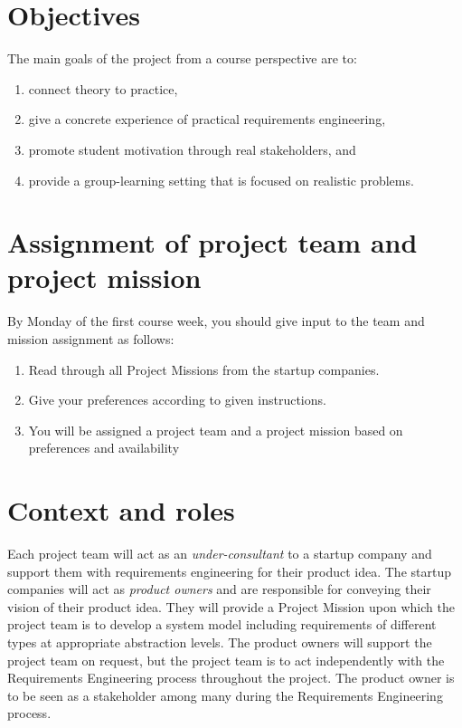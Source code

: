 \maketitle
\vspace{-1cm}

\section{Objectives}
The main goals of the project from a course perspective are to:
\begin{enumerate}[noitemsep]
\item connect theory to practice,
\item give a concrete experience of practical requirements engineering,
\item promote student motivation through real stakeholders, and
\item provide a group-learning setting that is focused on realistic problems.
\end{enumerate}

\ifteknolog
   \section{Assignment of project team and project mission}
   By Monday of the first course week, you should give input to the team and mission
assignment as follows:
\begin{enumerate}[noitemsep]
   \item Read through all Project Missions from the startup companies.
   \item  Give your preferences according to given instructions.
   \item  You will be assigned a project team and a project mission based on preferences
   and availability
\end{enumerate}
\fi

\ifteknolog
   \section{Context and roles}

   \noindent Each project team will act as an \textit{under-consultant} to a startup company and support them with requirements engineering for their product idea. The startup companies will act as \textit{product owners} and are responsible for conveying their vision of their product idea. They will provide a Project Mission upon which the project team is to develop a system model including requirements of different types at appropriate abstraction levels. The product owners will support the project team on request, but the project team is to act independently with the Requirements Engineering process throughout the project. The product owner is to be seen as a stakeholder among many during the Requirements Engineering process.
   \newline

